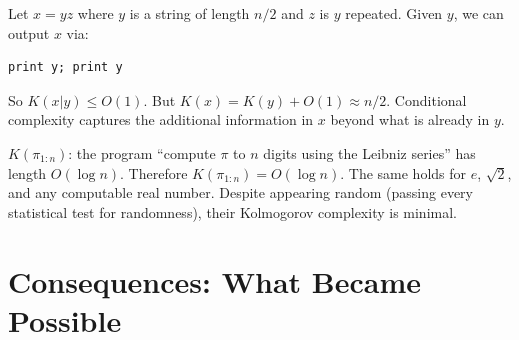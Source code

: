 \begin{example}
Let $x = yz$ where $y$ is a string of length $n/2$ and $z$ is $y$ repeated. Given $y$, we can output $x$ via:
\begin{verbatim}
print y; print y
\end{verbatim}
So $K(x|y) \le O(1)$. But $K(x) = K(y) + O(1) \approx n/2$. Conditional complexity captures the additional information in $x$ beyond what is already in $y$.
\end{example}

\begin{example}
$K(\pi_{1:n})$: the program ``compute $\pi$ to $n$ digits using the Leibniz series'' has length $O(\log n)$. Therefore $K(\pi_{1:n}) = O(\log n)$. The same holds for $e$, $\sqrt{2}$, and any computable real number. Despite appearing random (passing every statistical test for randomness), their Kolmogorov complexity is minimal.
\end{example}

\section{Consequences: What Became Possible}
\label{sec:kolmogorov:consequences}

